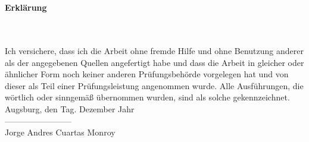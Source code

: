 

\section*{}
\vfill
\begin{huge}
\textbf{Erklärung}
\end{huge}
\\\\
Ich versichere, dass ich die Arbeit ohne fremde Hilfe und ohne Benutzung
anderer  als der angegebenen Quellen angefertigt habe und dass die Arbeit in 
gleicher oder ähnlicher Form noch keiner anderen Prüfungsbehörde vorgelegen hat
und von dieser als Teil einer Prüfungsleistung angenommen wurde. Alle 
Ausführungen, die wörtlich oder sinngemäß übernommen wurden, sind als solche 
gekennzeichnet.\\


\noindent
Augsburg, den Tag. Dezember Jahr\\


\noindent 
------------------------\\
Jorge Andres Cuartas Monroy
\vfill